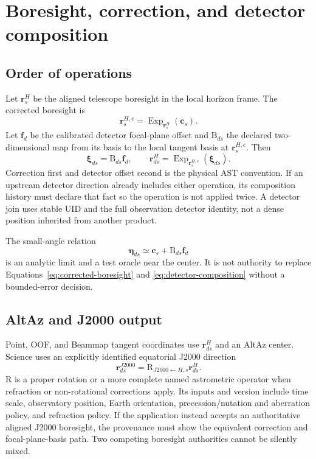 \documentclass[11pt]{article}
\renewcommand{\mathsf}[1]{\mathrm{#1}}
\begin{document}
\section{Boresight, correction, and detector composition}

\subsection{Order of operations}

Let $\boldsymbol r^H_s$ be the aligned telescope boresight in the local
horizon frame.  The corrected boresight is
\begin{equation}
 \boldsymbol r^{H,c}_s=
 \operatorname{Exp}_{\boldsymbol r^H_s}(\boldsymbol c_s).
 \label{eq:corrected-boresight}
\end{equation}
Let $\boldsymbol f_d$ be the calibrated detector focal-plane offset and
$\mathsf B_{ds}$ the declared two-dimensional map from its basis to the local
tangent basis at $\boldsymbol r^{H,c}_s$.  Then
\begin{equation}
 \boldsymbol\xi_{ds}=\mathsf B_{ds}\boldsymbol f_d,
 \qquad
 \boldsymbol r^H_{ds}=
 \operatorname{Exp}_{\boldsymbol r^{H,c}_s}(\boldsymbol\xi_{ds}).
 \label{eq:detector-composition}
\end{equation}
Correction first and detector offset second is the physical AST convention.
If an upstream detector direction already includes either operation, its
composition history must declare that fact so the operation is not applied
twice.  A detector join uses stable UID and the full observation detector
identity, not a dense position inherited from another product.

The small-angle relation
\begin{equation}
 \boldsymbol\eta_{ds}\simeq\boldsymbol c_s+\mathsf B_{ds}\boldsymbol f_d
 \label{eq:small-angle}
\end{equation}
is an analytic limit and a test oracle near the center.  It is not authority
to replace Equations~\eqref{eq:corrected-boresight} and
\eqref{eq:detector-composition} without a bounded-error decision.

\subsection{AltAz and J2000 output}

Point, OOF, and Beammap tangent coordinates use $\boldsymbol r^H_{ds}$ and an
AltAz center.  Science uses an explicitly identified equatorial J2000
direction
\begin{equation}
 \boldsymbol r^{J2000}_{ds}=
 \mathsf R_{J2000\leftarrow H,s}\boldsymbol r^H_{ds}.
 \label{eq:frame-transform}
\end{equation}
$\mathsf R$ is a proper rotation or a more complete named astrometric
operator when refraction or non-rotational corrections apply.  Its inputs and
version include time scale, observatory position, Earth orientation,
precession/nutation and aberration policy, and refraction policy.  If the
application instead accepts an authoritative aligned J2000 boresight, the
provenance must show the equivalent correction and focal-plane-basis path.
Two competing boresight authorities cannot be silently mixed.
\end{document}
